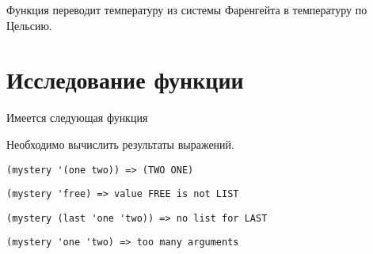 

\problem Функция переводит температуру из системы Фаренгейта в температуру по Цельсию.




\section{Исследование функции}

Имеется следующая функция


\noindent
Необходимо вычислить результаты выражений.


\problem \hfill
\begin{lstlisting}
(mystery '(one two)) => (TWO ONE)
\end{lstlisting}


\problem \hfill
\begin{lstlisting}
(mystery 'free) => value FREE is not LIST
\end{lstlisting}


\problem \hfill
\begin{lstlisting}
(mystery (last 'one 'two)) => no list for LAST
\end{lstlisting}


\problem \hfill
\begin{lstlisting}
(mystery 'one 'two) => too many arguments
\end{lstlisting}